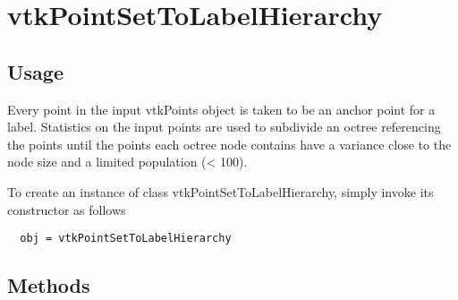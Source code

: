 \section{vtkPointSetToLabelHierarchy}

\subsection{Usage}


 Every point in the input vtkPoints object is taken to be an
 anchor point for a label. Statistics on the input points
 are used to subdivide an octree referencing the points
 until the points each octree node contains have a variance
 close to the node size and a limited population (< 100).

To create an instance of class vtkPointSetToLabelHierarchy, simply
invoke its constructor as follows
\begin{verbatim}
  obj = vtkPointSetToLabelHierarchy
\end{verbatim}
\subsection{Methods}

